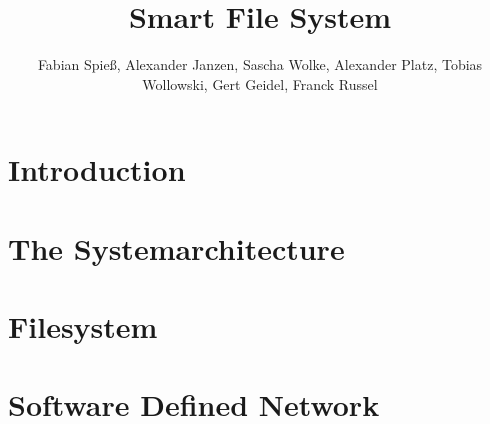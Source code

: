 \documentclass[journal]{IEEEtran}
\begin{document}
\title{Smart File System}



\author{Fabian Spie\ss, Alexander Janzen, Sascha Wolke, Alexander Platz, Tobias Wollowski, Gert Geidel, Franck Russel}


\maketitle





\begin{abstract}




\end{abstract}



\IEEEpeerreviewmaketitle







\section{Introduction}



\section{The Systemarchitecture}







\section{Filesystem}





\section{Software Defined Network}


\end{document}
